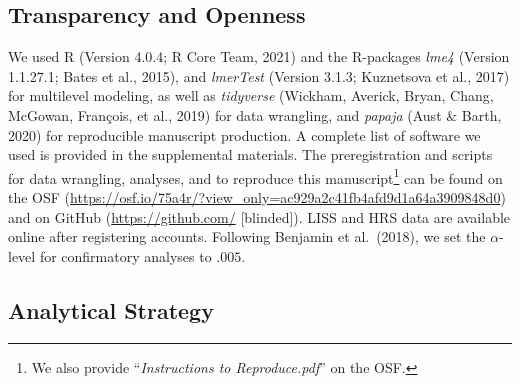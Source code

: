 \documentclass[
  english,
  man,floatsintext]{apa7}
\begin{document}
\hypertarget{transparency-and-openness}{%
\subsection{Transparency and Openness}\label{transparency-and-openness}}

We used R (Version 4.0.4; R Core Team, 2021) and the R-packages \emph{lme4} (Version 1.1.27.1; Bates et al., 2015), and \emph{lmerTest} (Version 3.1.3; Kuznetsova et al., 2017) for multilevel modeling, as well as \emph{tidyverse} (Wickham, Averick, Bryan, Chang, McGowan, François, et al., 2019) for data wrangling, and \emph{papaja} (Aust \& Barth, 2020) for reproducible manuscript production. A complete list of software we used is provided in the supplemental materials. The preregistration and scripts for data wrangling, analyses, and to reproduce this manuscript\footnote{We also provide \enquote{\emph{Instructions to Reproduce.pdf}} on the OSF.} can be found on the OSF (\url{https://osf.io/75a4r/?view_only=ac929a2c41fb4afd9d1a64a3909848d0}) and on GitHub (\url{https://github.com/} {[}blinded{]}). LISS and HRS data are available online after registering accounts. Following Benjamin et al.~(2018), we set the \(\alpha\)-level for confirmatory analyses to \(.005\).

\hypertarget{analytical-strategy}{%
\subsection{Analytical Strategy}\label{analytical-strategy}}
\end{document}

